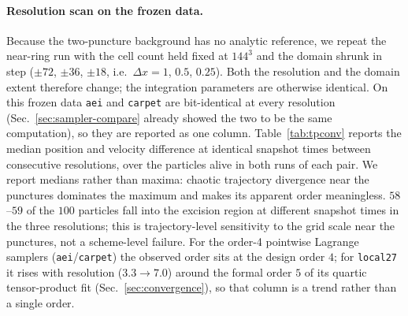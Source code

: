 \documentclass[11pt]{article}
\begin{document}
\paragraph{Resolution scan on the frozen data.}
Because the two-puncture background has no analytic reference, we repeat the
near-ring run with the cell count held fixed at $144^3$ and the domain shrunk
in step ($\pm72$, $\pm36$, $\pm18$, i.e.\ $\Delta x = 1$, $0.5$, $0.25$).
Both the resolution and the domain extent therefore change; the integration
parameters are otherwise identical.  On this frozen data
\texttt{aei} and \texttt{carpet} are bit-identical at every resolution
(Sec.~\ref{sec:sampler-compare} already showed the two to be the same
computation), so they are reported as one column.  Table~\ref{tab:tpconv}
reports the median position and velocity difference at identical snapshot times
between consecutive resolutions, over the particles alive in both runs of each
pair.  We report medians rather than maxima: chaotic trajectory divergence near
the punctures dominates the maximum and makes its apparent order meaningless.
$58$--$59$ of the $100$ particles fall into the excision region at different
snapshot times in the three resolutions; this is trajectory-level sensitivity to
the grid scale near the punctures, not a scheme-level failure.  For the order-4
pointwise Lagrange samplers (\texttt{aei}/\texttt{carpet}) the observed order
sits at the design order $4$; for \texttt{local27} it rises with resolution
($3.3\to7.0$) around the formal order $5$ of its quartic tensor-product fit
(Sec.~\ref{sec:convergence}), so that column is a trend rather than a single
order.
\end{document}
